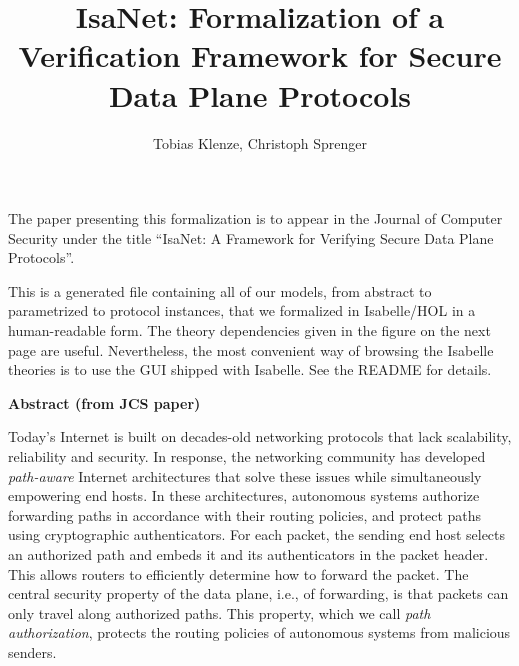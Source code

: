 \documentclass[11pt,a4paper]{report}
\begin{document}
\title{IsaNet: Formalization of a Verification Framework for Secure Data Plane Protocols}
\author{Tobias Klenze, Christoph Sprenger}
\maketitle

\tableofcontents

\newpage

The paper presenting this formalization is to appear in the Journal of Computer Security under the title ``IsaNet: A Framework for Verifying Secure Data Plane Protocols''.

This is a generated file containing all of our models, from abstract to parametrized to protocol instances, that we formalized in Isabelle/HOL in a human-readable form. 
The theory dependencies given in the figure on the next page are useful.
Nevertheless, the most convenient way of browsing the Isabelle theories is to use the GUI shipped with Isabelle. See the README for details.

\textbf{Abstract (from JCS paper)}

Today's Internet is built on decades-old networking protocols that lack scalability, reliability and security.
In response, the networking community has developed \emph{path-aware} Internet architectures that solve these issues while simultaneously empowering end hosts.
In these architectures, autonomous systems authorize forwarding paths in accordance with their routing policies, and protect paths using cryptographic authenticators.
For each packet, the sending end host selects an authorized path and embeds it and its authenticators in the packet header. This allows routers to efficiently determine how to forward the packet.
The central security property of the data plane, i.e., of forwarding, is that packets can only travel along authorized paths. This property, which we call \emph{path authorization}, protects the routing policies of autonomous systems from malicious senders.
\end{document}

